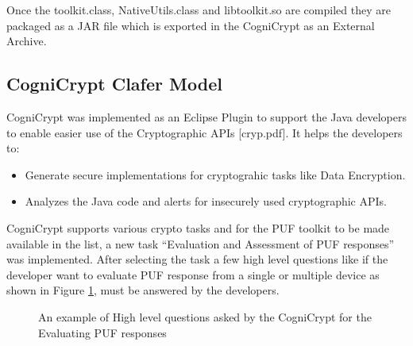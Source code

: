 Once the toolkit.class, NativeUtils.class and libtoolkit.so are compiled they are packaged as a JAR file which is exported in the CogniCrypt as an External Archive.

\subsection{CogniCrypt Clafer Model}
CogniCrypt was implemented as an Eclipse Plugin to support the Java developers to enable easier use of the Cryptographic APIs [cryp.pdf]. It helps the developers to:
\begin{itemize}
	\item Generate secure implementations for cryptograhic tasks like Data Encryption.
	\item Analyzes the Java code and alerts for insecurely used cryptographic APIs.
\end{itemize}

CogniCrypt supports various crypto tasks and for the PUF toolkit to be made available in the list, a new task ``Evaluation and Assessment of PUF responses'' was implemented. After selecting the task a few high level questions like if the developer want to evaluate PUF response from a single or multiple device as shown in Figure \ref{img:cogni_ques}, must be answered by the developers.\\

\begin{figure}[h]
\centering
{}
\caption{An example of High level questions asked by the CogniCrypt for the Evaluating PUF responses}
\label{img:cogni_ques}
\end{figure}

